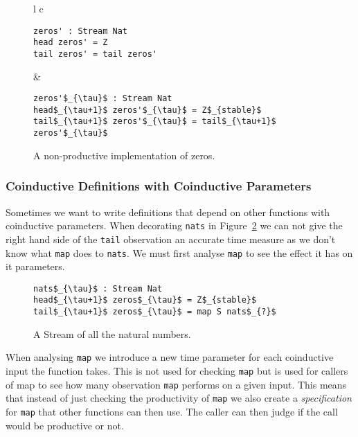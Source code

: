 \begin{figure}
\begin{tabular}{l c}
\begin{minipage}{3in}
\begin{Verbatim}[commandchars=\\\{\},codes={\catcode`$=3\catcode`_=8}]
zeros' : Stream Nat
head zeros' = Z
tail zeros' = tail zeros'
\end{Verbatim}
\end{minipage} &
\begin{minipage}{3in}
\begin{Verbatim}[commandchars=\\\{\},codes={\catcode`$=3\catcode`_=8}]
zeros'$_{\tau}$ : Stream Nat
head$_{\tau+1}$ zeros'$_{\tau}$ = Z$_{stable}$
tail$_{\tau+1}$ zeros'$_{\tau}$ = tail$_{\tau+1}$ zeros'$_{\tau}$
\end{Verbatim}
\end{minipage}
\end{tabular}
\caption{A non-productive implementation of zeros.}
\label{fig:zerosprime}
\end{figure}

\subsubsection{Coinductive Definitions with Coinductive Parameters}

Sometimes we want to write definitions that depend on other functions with coinductive parameters. When decorating \texttt{nats} in Figure~\ref{fig:nats} we can not give the right hand side of the \texttt{tail} observation an accurate time measure as we don't know what \texttt{map} does to \texttt{nats}. We must first analyse \texttt{map} to see the effect it has on it parameters.

\begin{figure}
\begin{Verbatim}[commandchars=\\\{\},codes={\catcode`$=3\catcode`_=8}]
nats$_{\tau}$ : Stream Nat
head$_{\tau+1}$ zeros$_{\tau}$ = Z$_{stable}$
tail$_{\tau+1}$ zeros$_{\tau}$ = map S nats$_{?}$
\end{Verbatim}
\caption{A Stream of all the natural numbers.}
\label{fig:nats}
\end{figure}

When analysing \texttt{map} we introduce a new time parameter for each coinductive input the function takes. This is not used for checking \texttt{map} but is used for callers of map to see how many observation \texttt{map} performs on a given input. This means that instead of just checking the productivity of \texttt{map} we also create a \textit{specification} for \texttt{map} that other functions can then use. The caller can then judge if the call would be productive or not.

